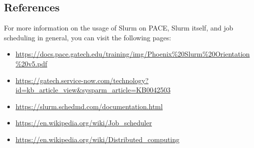 \documentclass{article}
\begin{document}
\subsection{References}

For more information on the usage of Slurm on PACE, Slurm itself, and job scheduling in general, you can visit the following pages:

\begin{itemize}
    \item \url{https://docs.pace.gatech.edu/training/img/Phoenix%20Slurm%20Orientation%20v5.pdf}
    \item \url{https://gatech.service-now.com/technology?id=kb_article_view&sysparm_article=KB0042503}
    \item \url{https://slurm.schedmd.com/documentation.html}
    \item \url{https://en.wikipedia.org/wiki/Job_scheduler}
    \item \url{https://en.wikipedia.org/wiki/Distributed_computing}
\end{itemize}
\end{document}
